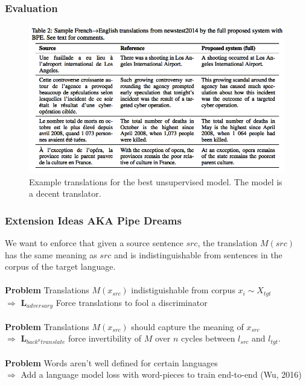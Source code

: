 \documentclass{beamer}
\begin{document}
\begin{frame}
\frametitle{Evaluation}
 \begin{figure}
  \centering
  \includegraphics[width=.9\textwidth]{pres_imgs/unsupfrench}
  \caption{\label{fig:unsupfrench} Example translations for the best unsupervised model. The model is a decent translator.}
\end{figure}
\end{frame}
\begin{frame}
\frametitle{Extension Ideas AKA Pipe Dreams}
We want to enforce that given a source sentence $src$, the translation $M(src)$ has the same meaning as $src$ and is indistinguishable from sentences in the corpus of the target language.\\ \pause
~\\
\textbf{Problem} Translations $M(x_{src})$ indistiguishable from corpus $x_i \sim X_{tgt}$\\ \pause
$\Rightarrow$ \textbf{L$_{adversary}$} Force translations to fool a discriminator\\ \pause
~\\
\textbf{Problem} Translations $M(x_{src})$ should capture the meaning of $x_{src}$\\ \pause
$\Rightarrow$ \textbf{L$_{back^n translate}$} force invertibility of $M$ over $n$ cycles between $l_{src}$ and $l_{tgt}$.\\ \pause
~\\
\textbf{Problem} Words aren't well defined for certain languages\\ \pause
$\Rightarrow$ Add a language model loss with word-pieces to train end-to-end (Wu, 2016)\\
\end{frame}


\end{document}

